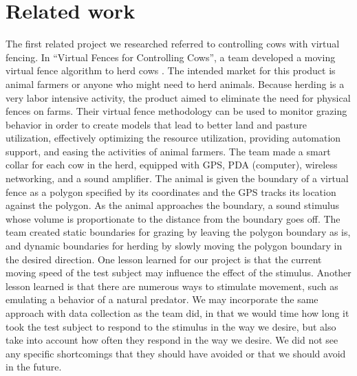 \documentclass[twocolumn,10pt]{IEEEtran}
\begin{document}
\section{Related work}
The first related project we researched referred to controlling cows with virtual fencing. In ``Virtual Fences for Controlling Cows'', a team developed a moving virtual fence algorithm to herd cows \cite{butler2004virtual}. The intended market for this product is animal farmers or anyone who might need to herd animals. Because herding is a very labor intensive activity, the product aimed to eliminate the need for physical fences on farms. Their virtual fence methodology can be used to monitor grazing behavior in order to create models that lead to better land and pasture utilization, effectively optimizing the resource utilization, providing automation support, and easing the activities of animal farmers. The team made a smart collar for each cow in the herd, equipped with GPS, PDA (computer), wireless networking, and a sound amplifier. The animal is given the boundary of a virtual fence as a polygon specified by its coordinates and the GPS tracks its location against the polygon. As the animal approaches the boundary, a sound stimulus whose volume is proportionate to the distance from the boundary goes off. The team created static boundaries for grazing by leaving the polygon boundary as is, and dynamic boundaries for herding by slowly moving the polygon boundary in the desired direction. One lesson learned for our project is that the current moving speed of the test subject may influence the effect of the stimulus. Another lesson learned is that there are numerous ways to stimulate movement, such as emulating a behavior of a natural predator. We may incorporate the same approach with data collection as the team did, in that we would time how long it took the test subject to respond to the stimulus in the way we desire, but also take into account how often they respond in the way we desire. We did not see any specific shortcomings that they should have avoided or that we should avoid in the future. 
\end{document}
